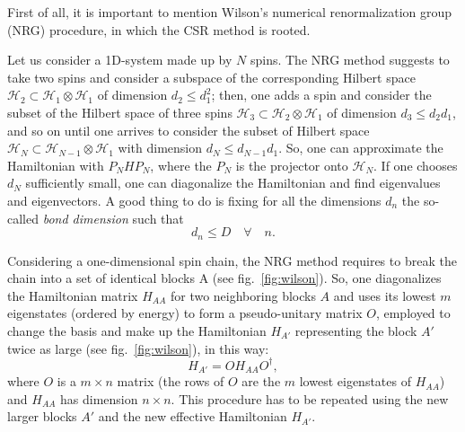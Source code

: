 First of all, it is important to mention Wilson's numerical renormalization group (NRG) procedure, in which the CSR method is rooted. 

Let us consider a 1D-system made up by $N$ spins. The NRG method suggests to take two spins and consider a subspace of the corresponding Hilbert space $\mathcal{H}_2 \subset \mathcal{H}_1 \otimes \mathcal{H}_1$ of dimension $d_2 \leq d_1^2$; then, one adds a spin and consider the subset of the Hilbert space of three spins $\mathcal{H}_3 \subset \mathcal{H}_2 \otimes \mathcal{H}_1$ of dimension $d_3 \leq d_2d_1$, and so on until one arrives to consider the subset of Hilbert space $\mathcal{H}_N \subset \mathcal{H}_{N-1} \otimes \mathcal{H}_1$ with dimension $d_N \leq d_{N-1}d_1$. So, one can approximate the Hamiltonian with $P_NHP_N$, where the $P_N$ is the projector onto $\mathcal{H}_N$. If one chooses $d_N$ sufficiently small, one can diagonalize the Hamiltonian and find eigenvalues and eigenvectors. A good thing to do is fixing for all the dimensions $d_n$ the so-called \emph{bond dimension} such that 
\begin{equation*}
    d_n \leq D \quad \forall \quad n. 
\end{equation*}

Considering a one-dimensional spin chain,  the NRG method requires to break the chain into a set of identical blocks A (see fig.~\ref{fig:wilson}). So, one diagonalizes the Hamiltonian matrix $H_{AA}$ for two neighboring blocks $A$ and uses its lowest $m$ eigenstates (ordered by energy) to form a pseudo-unitary matrix $O$, employed to change the basis and make up the Hamiltonian $H_{A'}$ representing the block $A'$ twice as large (see fig.~\ref{fig:wilson}), in this way:
\begin{equation*}
    H_{A'} = OH_{AA}O^\dagger,
\end{equation*}
where $O$ is a $m\times n$ matrix (the rows of $O$ are the $m$ lowest eigenstates of $H_{AA}$) and $H_{AA}$ has dimension $n \times n$. This procedure has to be repeated using the new larger blocks $A'$ and the new effective Hamiltonian $H_{A'}$. 

